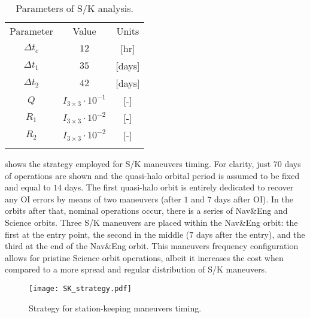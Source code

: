 %
%
\begin{table}[b!]
	\caption{Parameters of S/K analysis.}
	\label{tab:SKParameters}
	\centering
	\begin{tabular}{ccc}
		\TOPlines
		Parameter & Value & Units \\
		\MIDline
		$\Delta t_c$ & $12$ & [hr] \\
		$\Delta t_1$ & $35$ & [days] \\
		$\Delta t_2$ & $42$ & [days] \\				$Q$ & $I_{3\times3}\cdot10^{-1}$ & [-] \\
		$R_1$ & $I_{3\times3}\cdot10^{-2}$ & [-] \\
		$R_2$ & $I_{3\times3}\cdot10^{-2}$ & [-] \\
		\BOTTOMlines
	\end{tabular}
\end{table}
%

 shows the strategy employed for S/K maneuvers timing. For clarity, just $70$ days of operations are shown and the quasi-halo orbital period is assumed to be fixed and equal to $14$ days. The first quasi-halo orbit is entirely dedicated to recover any {OI} errors by means of two maneuvers (after $1$ and $7$ days after OI). In the orbits after that, nominal operations occur, \ie there is a series of Nav\&Eng and Science orbits. Three S/K maneuvers are placed within the Nav\&Eng orbit: the first at the entry point, the second in the middle (\ie $7$ days after the entry), and the third at the end of the Nav\&Eng orbit. This maneuvers frequency configuration allows for pristine Science orbit operations, albeit it increases the cost when compared to a more spread and regular distribution of S/K maneuvers.
%
\begin{figure*}[]
	\centering
	\texttt{[image: SK\_strategy.pdf]}
	\caption{Strategy for station-keeping maneuvers timing.}
	\label{fig:SK_strategy}
\end{figure*}
%

